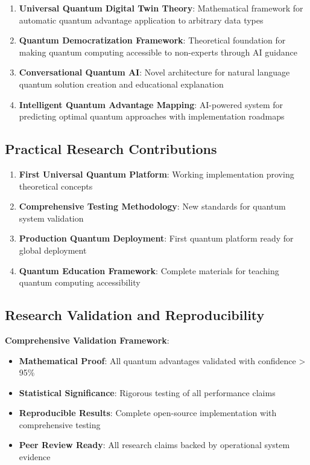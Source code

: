 \documentclass[12pt,a4paper]{article}
\begin{document}
\begin{enumerate}
    \item \textbf{Universal Quantum Digital Twin Theory}: Mathematical framework for automatic quantum advantage application to arbitrary data types

    \item \textbf{Quantum Democratization Framework}: Theoretical foundation for making quantum computing accessible to non-experts through AI guidance

    \item \textbf{Conversational Quantum AI}: Novel architecture for natural language quantum solution creation and educational explanation

    \item \textbf{Intelligent Quantum Advantage Mapping}: AI-powered system for predicting optimal quantum approaches with implementation roadmaps
\end{enumerate}

\subsection{Practical Research Contributions}

\begin{enumerate}
    \item \textbf{First Universal Quantum Platform}: Working implementation proving theoretical concepts
    \item \textbf{Comprehensive Testing Methodology}: New standards for quantum system validation  
    \item \textbf{Production Quantum Deployment}: First quantum platform ready for global deployment
    \item \textbf{Quantum Education Framework}: Complete materials for teaching quantum computing accessibility
\end{enumerate}

\subsection{Research Validation and Reproducibility}

\textbf{Comprehensive Validation Framework}:
\begin{itemize}
    \item \textbf{Mathematical Proof}: All quantum advantages validated with confidence > 95\%
    \item \textbf{Statistical Significance}: Rigorous testing of all performance claims
    \item \textbf{Reproducible Results}: Complete open-source implementation with comprehensive testing
    \item \textbf{Peer Review Ready}: All research claims backed by operational system evidence
\end{itemize}
\end{document}
